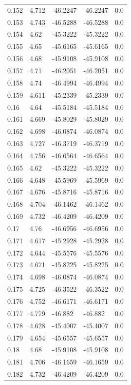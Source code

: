 \begin{table}[H]
\begin{tabular}{lllll}
0.152 & 4.712 & -46.2247 & -46.2247 & 0.0 \\
0.153 & 4.743 & -46.5288 & -46.5288 & 0.0 \\
0.154 & 4.62 & -45.3222 & -45.3222 & 0.0 \\
0.155 & 4.65 & -45.6165 & -45.6165 & 0.0 \\
0.156 & 4.68 & -45.9108 & -45.9108 & 0.0 \\
0.157 & 4.71 & -46.2051 & -46.2051 & 0.0 \\
0.158 & 4.74 & -46.4994 & -46.4994 & 0.0 \\
0.159 & 4.611 & -45.2339 & -45.2339 & 0.0 \\
0.16 & 4.64 & -45.5184 & -45.5184 & 0.0 \\
0.161 & 4.669 & -45.8029 & -45.8029 & 0.0 \\
0.162 & 4.698 & -46.0874 & -46.0874 & 0.0 \\
0.163 & 4.727 & -46.3719 & -46.3719 & 0.0 \\
0.164 & 4.756 & -46.6564 & -46.6564 & 0.0 \\
0.165 & 4.62 & -45.3222 & -45.3222 & 0.0 \\
0.166 & 4.648 & -45.5969 & -45.5969 & 0.0 \\
0.167 & 4.676 & -45.8716 & -45.8716 & 0.0 \\
0.168 & 4.704 & -46.1462 & -46.1462 & 0.0 \\
0.169 & 4.732 & -46.4209 & -46.4209 & 0.0 \\
0.17 & 4.76 & -46.6956 & -46.6956 & 0.0 \\
0.171 & 4.617 & -45.2928 & -45.2928 & 0.0 \\
0.172 & 4.644 & -45.5576 & -45.5576 & 0.0 \\
0.173 & 4.671 & -45.8225 & -45.8225 & 0.0 \\
0.174 & 4.698 & -46.0874 & -46.0874 & 0.0 \\
0.175 & 4.725 & -46.3522 & -46.3522 & 0.0 \\
0.176 & 4.752 & -46.6171 & -46.6171 & 0.0 \\
0.177 & 4.779 & -46.882 & -46.882 & 0.0 \\
0.178 & 4.628 & -45.4007 & -45.4007 & 0.0 \\
0.179 & 4.654 & -45.6557 & -45.6557 & 0.0 \\
0.18 & 4.68 & -45.9108 & -45.9108 & 0.0 \\
0.181 & 4.706 & -46.1659 & -46.1659 & 0.0 \\
0.182 & 4.732 & -46.4209 & -46.4209 & 0.0 \\

\end{tabular}
\end{table}

